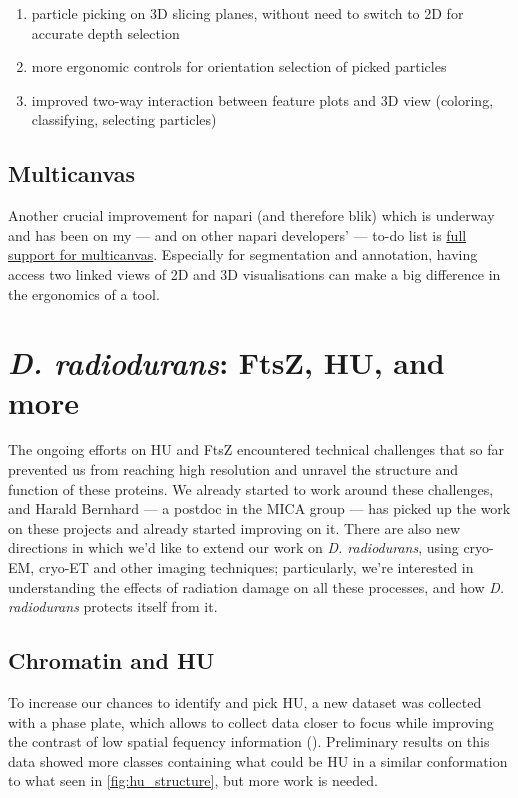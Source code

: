 \begin{enumerate}[noitemsep]
    \item particle picking on 3D slicing planes, without need to switch to 2D for accurate depth selection
    \item more ergonomic controls for orientation selection of picked particles
    \item improved two-way interaction between feature plots and 3D view (coloring, classifying, selecting particles)
\end{enumerate}

\subsection{Multicanvas}
Another crucial improvement for napari (and therefore blik) which is underway and has been on my --- and on other napari developers' --- to-do list is \href{https://github.com/napari/napari/issues/5348}{full support for multicanvas}.
Especially for segmentation and annotation, having access two linked views of 2D and 3D visualisations can make a big difference in the ergonomics of a tool.


\section{\textit{D. radiodurans}: FtsZ, HU, and more}

The ongoing efforts on HU and FtsZ encountered technical challenges that so far prevented us from reaching high resolution and unravel the structure and function of these proteins.
We already started to work around these challenges, and Harald Bernhard --- a postdoc in the MICA group --- has picked up the work on these projects and already started improving on it.
There are also new directions in which we'd like to extend our work on \textit{D. radiodurans}, using cryo-EM, cryo-ET and other imaging techniques; particularly, we're interested in understanding the effects of radiation damage on all these processes, and how \textit{D. radiodurans} protects itself from it.

\subsection{Chromatin and HU}

To increase our chances to identify and pick HU, a new dataset was collected with a phase plate, which allows to collect data closer to focus while improving the contrast of low spatial fequency information ().
Preliminary results on this data showed more classes containing what could be HU in a similar conformation to what seen in \autoref{fig:hu_structure}, but more work is needed.

